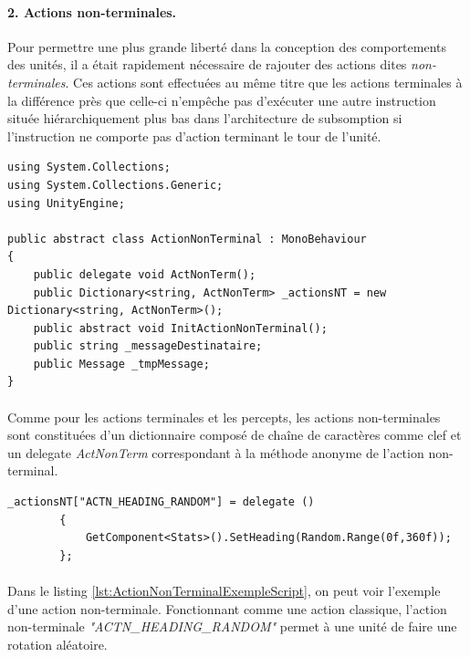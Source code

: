 \documentclass{report}
\begin{document}
\paragraph{2. Actions non-terminales.}
Pour permettre une plus grande liberté dans la conception des comportements des unités, il a était rapidement nécessaire de rajouter des actions dites \textit{non-terminales}. Ces actions sont effectuées au même titre que les actions terminales à la différence près que celle-ci n’empêche pas d’exécuter une autre instruction située hiérarchiquement plus bas dans l'architecture de subsomption si l'instruction ne comporte pas d'action terminant le tour de l'unité.

\begin{lstlisting}[language={[Sharp]C},label={lst:ActionNonTerminalScript}, caption=Code du script ActionNonTerminal.cs]
using System.Collections;
using System.Collections.Generic;
using UnityEngine;

public abstract class ActionNonTerminal : MonoBehaviour
{
    public delegate void ActNonTerm();
    public Dictionary<string, ActNonTerm> _actionsNT = new Dictionary<string, ActNonTerm>();
    public abstract void InitActionNonTerminal();
    public string _messageDestinataire;
    public Message _tmpMessage;
}

\end{lstlisting}
\paragraph{}
Comme pour les actions terminales et les percepts, les actions non-terminales sont constituées d'un dictionnaire composé de chaîne de caractères comme clef et un delegate \textit{ActNonTerm} correspondant à la méthode anonyme de l'action non-terminal.

\begin{lstlisting}[language={[Sharp]C},label={lst:ActionNonTerminalExempleScript}, caption=Exemple d'une action non-terminale]
        _actionsNT["ACTN_HEADING_RANDOM"] = delegate ()
        {
            GetComponent<Stats>().SetHeading(Random.Range(0f,360f));
        };
\end{lstlisting}

\paragraph{}
Dans le listing \ref{lst:ActionNonTerminalExempleScript}, on peut voir l'exemple d'une action non-terminale. Fonctionnant comme une action classique, l'action non-terminale \textit{"ACTN\_HEADING\_RANDOM"} permet à une unité de faire une rotation aléatoire.
\end{document}
